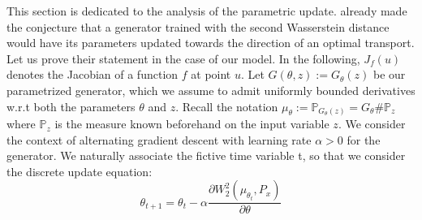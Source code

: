 \documentclass[runningheads]{llncs}
\newcommand\mycitet[1]{\cite{#1}}
\begin{document}
\label{parametric analysis}
This section is dedicated to the analysis of the parametric update. \mycitet{lui2017implicit} already made the conjecture that a generator trained with the second Wasserstein distance would have its parameters updated towards the direction of an optimal transport. Let us prove their statement in the case of our model. In the following, $J_{f}(u)$ denotes the Jacobian of a function $f$ at point $u$. Let $G(\theta,z):=G_\theta(z)$ be our parametrized generator, which we assume to admit uniformly bounded derivatives w.r.t both the parameters $\theta$ and $z$. Recall the notation $\mu_\theta:=\mathds{P}_{G_\theta(z)}=G_\theta\#\mathds{P}_z$ where $\mathds{P}_z$ is the measure known beforehand on the input variable $z$. We consider the context of alternating gradient descent with learning rate $\alpha>0$ for the generator. We naturally associate the fictive time variable t, so that we consider the discrete update equation:
\begin{equation}
   \theta_{t+1} = \theta_t -\alpha \frac{\partial{W_2^2(\mu_{\theta_t},P_x)}}{\partial \theta}
  \label{UPDATE_THETA}
\end{equation}
\end{document}
